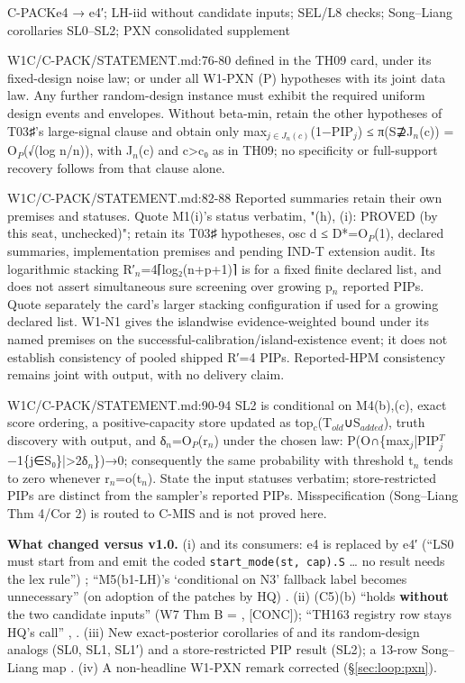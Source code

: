 \begin{card}{C-PACK}{e4 → e4′; LH-iid without candidate inputs; SEL/L8 checks; Song–Liang corollaries SL0–SL2; PXN consolidated supplement}
\begin{stmt}{W1C/C-PACK/STATEMENT.md:76-80}
defined in the TH09 card, under its fixed-design noise law; or under all W1-PXN (P) hypotheses with its joint data law.
Any further random-design instance must exhibit the required uniform design events and envelopes. Without beta-min,
retain the other hypotheses of T03♯'s large-signal clause and obtain only max$_{j\in J_{n}(c)}$(1−PIP$_{j}$) ≤ π(S⊉J$_{n}$(c)) =
O$_{P}$(√(log n/n)), with J$_{n}$(c) and c>c₀ as in TH09; no specificity or full-support recovery follows from that clause alone.
\end{stmt}
\begin{stmt}{W1C/C-PACK/STATEMENT.md:82-88}
Reported summaries retain their own premises and statuses. Quote M1(i)'s status verbatim, "(h), (i): PROVED (by this seat,
unchecked)"; retain its T03♯ hypotheses, osc d ≤ D*=O$_{P}$(1), declared summaries, implementation premises and pending IND-T
extension audit. Its logarithmic stacking R′$_{n}$=4⌈log₂(n+p+1)⌉ is for a fixed finite declared list, and does not assert
simultaneous sure screening over growing p$_{n}$ reported PIPs. Quote separately the card's larger stacking configuration if
used for a growing declared list. W1-N1 gives the islandwise evidence-weighted bound under its named premises on the
successful-calibration/island-existence event; it does not establish consistency of pooled shipped R′=4 PIPs.
Reported-HPM consistency remains joint with output, with no delivery claim.
\end{stmt}
\begin{stmt}{W1C/C-PACK/STATEMENT.md:90-94}
SL2 is conditional on M4(b),(c), exact score ordering, a positive-capacity store updated as top$_{c}$(T$_{old}$∪S$_{added}$), truth
discovery with output, and δ$_{n}$=O$_{P}$(r$_{n}$) under the chosen law: P(O∩\{max$_{j}$|PIP$^{T}_{j}$−1\{j∈S₀\}|>2δ$_{n}$\})→0; consequently the same
probability with threshold t$_{n}$ tends to zero whenever r$_{n}$=o(t$_{n}$). State the input statuses verbatim; store-restricted PIPs
are distinct from the sampler's reported PIPs. Misspecification (Song–Liang Thm 4/Cor 2) is routed to C-MIS and is not
proved here.
\end{stmt}

\textbf{What changed versus v1.0.} (i)  and its consumers: e4 is replaced by e4′ (``LS0 must start from and emit the coded \texttt{start\_mode(st, cap).S} \ldots{} no result needs the lex rule'') ; ``M5(b1-LH)'s `conditional on N3' fallback label becomes unnecessary'' (on adoption of the patches by HQ) . (ii)  (C5)(b) ``holds \textbf{without} the two candidate inputs'' (W7 Thm B = , [CONC]); ``TH163 registry row stays HQ's call'' , . (iii) New exact-posterior corollaries of  and its random-design analogs (SL0, SL1, SL1′) and a store-restricted PIP result (SL2); a 13-row Song--Liang map . (iv) A non-headline W1-PXN remark corrected (\S\ref{sec:loop:pxn}).


\end{card}
